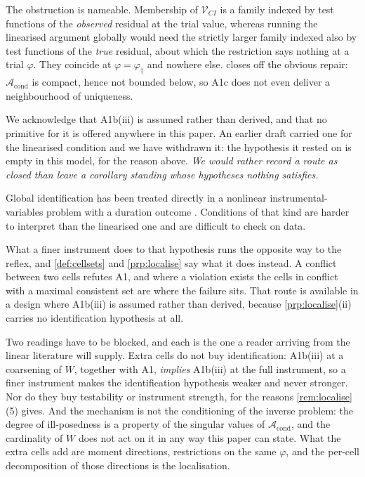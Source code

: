 \documentclass[
  12pt]{article}
\newcommand{\1}[1]{\mathds{1}\left[#1\right]}
\theoremstyle{plain}
\theoremstyle{definition}
\theoremstyle{definition}
\theoremstyle{remark}
\newcommand{\vdagger}{\varphi_{\dagger}}
\begin{document}
The obstruction is nameable. Membership of \(\mathcal V_{CI}\) is a
family indexed by test functions of the \emph{observed} residual at the
trial value, whereas running the linearised argument globally would need
the strictly larger family indexed also by test functions of the
\emph{true} residual, about which the restriction says nothing at a
trial \(\varphi\). They coincide at \(\varphi=\vdagger\) and nowhere
else.  closes off the obvious repair:
\(\mathcal A_{\mathrm{cond}}\) is compact, hence not bounded below, so
A1c does not even deliver a neighbourhood of uniqueness.

We acknowledge that A1b(iii) is assumed rather than derived, and that no
primitive for it is offered anywhere in this paper. An earlier draft
carried one for the linearised condition and we have withdrawn it: the
hypothesis it rested on is empty in this model, for the reason above.
\emph{We would rather record a route as
closed than leave a corollary standing whose hypotheses nothing satisfies.}

Global identification has been treated directly in a nonlinear
instrumental-variables problem with a duration outcome
\citep{beyhum2024}. Conditions of that kind are harder to interpret than
the linearised one and are difficult to check on data.

What a finer instrument does to that hypothesis runs the opposite way to
the reflex, and \cref{def:cellsets} and \cref{prp:localise} say what it
does instead. A conflict between two cells refutes A1, and where a
violation exists the cells in conflict with a maximal consistent set are
where the failure sits. That route is available in a design where
A1b(iii) is assumed rather than derived, because \cref{prp:localise}(ii)
carries no identification hypothesis at all.

Two readings have to be blocked, and each is the one a reader arriving
from the linear literature will supply. Extra cells do not buy
identification: A1b(iii) at a coarsening of \(W\), together with A1,
\emph{implies} A1b(iii) at the full instrument, so a finer instrument
makes the identification hypothesis weaker and never stronger. Nor do
they buy testability or instrument strength, for the reasons
\cref{rem:localise}(5) gives. And the mechanism is not the conditioning
of the inverse problem: the degree of ill-posedness is a property of the
singular values of \(\mathcal A_{\mathrm{cond}}\), and the cardinality
of \(W\) does not act on it in any way this paper can state. What the
extra cells add are moment directions, restrictions on the same
\(\varphi\), and the per-cell decomposition of those directions is the
localisation.
\end{document}
